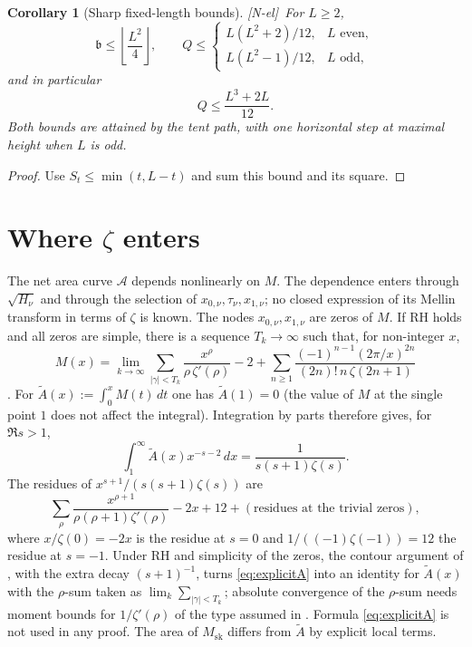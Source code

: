 \documentclass[11pt,reqno]{amsart}
\numberwithin{equation}{section}
\theoremstyle{plain}
\newtheorem{corollary}[theorem]{Corollary}
\theoremstyle{definition}
\theoremstyle{remark}
\newcommand{\Msk}{M_{\mathrm{sk}}}
\newcommand{\Anet}{\mathcal{A}}
\newcommand{\tagNE}{\textup{[N-el]}}
\begin{document}
\begin{corollary}[Sharp fixed-length bounds]
\label{cor:fixed-L}
\tagNE\ For $L\ge2$,
\begin{equation}
\mathfrak b\le\left\lfloor\frac{L^2}{4}\right\rfloor,\qquad
Q\le
\begin{cases}
L(L^2+2)/12,&L\text{ even},\\
L(L^2-1)/12,&L\text{ odd},
\end{cases}
\end{equation}
and in particular
\begin{equation}
\label{eq:Q_upper}
Q\le\frac{L^3+2L}{12}.
\end{equation}
Both bounds are attained by the tent path, with one horizontal step at
maximal height when $L$ is odd.
\end{corollary}

\begin{proof}
Use $S_t\le\min(t,L-t)$ and sum this bound and its square.
\end{proof}


\section{Where \texorpdfstring{$\zeta$}{zeta} enters}
\label{sec:zeta}

The net area curve $\Anet$ depends nonlinearly on $M$. The dependence enters through
$\sqrt{H_\nu}$ and through the selection of
$x_{0,\nu},\tau_\nu,x_{1,\nu}$; no closed expression of its Mellin transform
in terms of $\zeta$ is known. The nodes
$x_{0,\nu},x_{1,\nu}$ are zeros of $M$. If RH holds and all zeros are
simple, there is a sequence $T_k\to\infty$ such that, for non-integer $x$,
\begin{equation}
\label{eq:explicitM}
  M(x)=\lim_{k\to\infty}\sum_{|\gamma|<T_k}\frac{x^\rho}{\rho\,\zeta'(\rho)}-2
  +\sum_{n\ge1}\frac{(-1)^{n-1}(2\pi/x)^{2n}}{(2n)!\,n\,\zeta(2n+1)}
\end{equation}
\cite[\S14.27]{Titchmarsh1986}. For $\widetilde{A}(x):=\int_0^xM(t)\,dt$ one has
$\widetilde A(1)=0$ (the value of $M$ at the single point $1$ does not
affect the integral).  Integration by parts therefore gives, for
$\Re s>1$,
\begin{equation}
\label{eq:mellin_A}
  \int_1^\infty \widetilde{A}(x)x^{-s-2}\,dx=\frac{1}{s(s+1)\zeta(s)}.
\end{equation}
The residues of $x^{s+1}/(s(s+1)\zeta(s))$ are
\begin{equation}
\label{eq:explicitA}
  \sum_\rho\frac{x^{\rho+1}}{\rho(\rho+1)\zeta'(\rho)}-2x+12
  +(\text{residues at the trivial zeros}),
\end{equation}
where $x/\zeta(0)=-2x$ is the residue at $s=0$ and
$1/((-1)\zeta(-1))=12$ the residue at $s=-1$. Under RH and simplicity of the zeros, the contour argument of
\cite[\S14.27]{Titchmarsh1986}, with the extra decay $(s+1)^{-1}$, turns
\eqref{eq:explicitA} into an identity for $\widetilde A(x)$ with the
$\rho$-sum taken as $\lim_k\sum_{|\gamma|<T_k}$; absolute convergence of
the $\rho$-sum needs moment bounds for $1/\zeta'(\rho)$ of the type assumed
in \cite{Ng2004}. Formula \eqref{eq:explicitA} is not used in any proof. The area of $\Msk$ differs from
$\widetilde A$ by explicit local terms.
\end{document}
